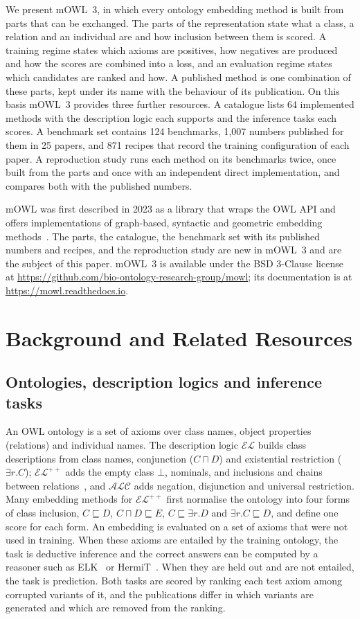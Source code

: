 \documentclass[runningheads]{llncs}
\newcommand{\EL}{\ensuremath{\mathcal{EL}}}
\newcommand{\ELpp}{\ensuremath{\mathcal{EL}^{++}}}
\newcommand{\ALC}{\ensuremath{\mathcal{ALC}}}
\begin{document}
We present mOWL~3, in which every ontology embedding method is built from parts that can
be exchanged. The parts of the representation state what a class, a relation and an
individual are and how inclusion between them is scored. A training regime states which
axioms are positives, how negatives are produced and how the scores are combined into a
loss, and an evaluation regime states which candidates are ranked and how. A published
method is one combination of these parts, kept under its name with the behaviour of its
publication. On this basis mOWL~3 provides three further resources. A catalogue lists 64
implemented methods with the description logic each supports and the inference tasks each
scores. A benchmark set contains 124 benchmarks, 1,007 numbers published for them in 25
papers, and 871 recipes that record the training configuration of each paper. A
reproduction study runs each method on its benchmarks twice, once built from the parts
and once with an independent direct implementation, and compares both with the published
numbers.

mOWL was first described in 2023 as a library that wraps the OWL API and offers
implementations of graph-based, syntactic and geometric embedding
methods~\cite{zhapa2022mowl}. The parts, the catalogue, the benchmark set with its
published numbers and recipes, and the reproduction study are new in mOWL~3 and are the
subject of this paper. mOWL~3 is available under the BSD 3-Clause license at
\url{https://github.com/bio-ontology-research-group/mowl}; its documentation is at
\url{https://mowl.readthedocs.io}.

\section{Background and Related Resources}

\subsection{Ontologies, description logics and inference tasks}

An OWL ontology is a set of axioms over class names, object properties (relations) and
individual names. The description logic \EL{} builds class descriptions from class
names, conjunction ($C \sqcap D$) and existential restriction ($\exists r.C$); \ELpp{}
adds the empty class $\bot$, nominals, and inclusions and chains between
relations~\cite{baader2005}, and \ALC{} adds negation, disjunction and universal
restriction. Many embedding methods for \ELpp{} first normalise the ontology into four
forms of class inclusion, $C \sqsubseteq D$, $C \sqcap D \sqsubseteq E$,
$C \sqsubseteq \exists r.D$ and $\exists r.C \sqsubseteq D$, and define one score for
each form. An embedding is evaluated on a set of axioms that were not used in training.
When these axioms are entailed by the training ontology, the task is deductive inference
and the correct answers can be computed by a reasoner such as ELK~\cite{kazakov2014} or
HermiT~\cite{glimm2014}. When they are held out and are not entailed, the task is
prediction. Both tasks are scored by ranking each test axiom among corrupted variants of
it, and the publications differ in which variants are generated and which are removed
from the ranking.
\end{document}

